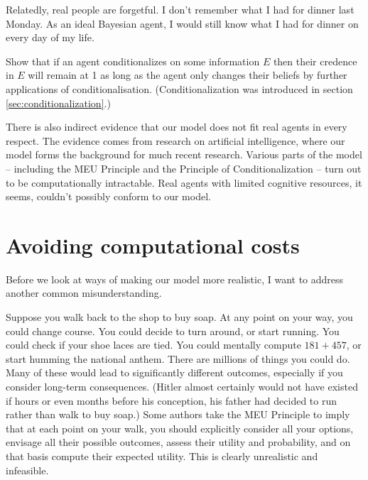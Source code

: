 Relatedly, real people are forgetful. I don't remember what I had for dinner
last Monday. As an ideal Bayesian agent, I would still know what I had for
dinner on every day of my life.

\begin{exercise}{2}
  Show that if an agent conditionalizes on some information $E$ then their
  credence in $E$ will remain at 1 as long as the agent only changes their
  beliefs by further applications of conditionalisation. (Conditionalization was
  introduced in section \ref{sec:conditionalization}.)
\end{exercise}


There is also indirect evidence that our model does not fit real agents in every
respect. The evidence comes from research on artificial intelligence, where our
model forms the background for much recent research. Various parts of the model
-- including the MEU Principle and the Principle of Conditionalization -- turn
out to be computationally intractable. Real agents with limited cognitive
resources, it seems, couldn't possibly conform to our model.

\section{Avoiding computational costs}

Before we look at ways of making our model more realistic, I want to address
another common misunderstanding.

Suppose you walk back to the shop to buy soap. At any point on your way, you
could change course. You could decide to turn around, or start running. You
could check if your shoe laces are tied. You could mentally compute $181 + 457$,
or start humming the national anthem. There are millions of things you could do.
Many of these would lead to significantly different outcomes, especially if you
consider long-term consequences. (Hitler almost certainly would not have existed
if hours or even months before his conception, his father had decided to run
rather than walk to buy soap.) Some authors take the MEU Principle to imply that
at each point on your walk, you should explicitly consider all your options,
envisage all their possible outcomes, assess their utility and probability, and
on that basis compute their expected utility. This is clearly unrealistic and
infeasible.

